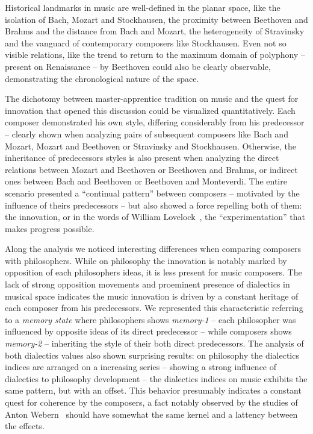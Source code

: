 \documentclass[
 aip,
 jmp,
 amsmath,amssymb,
 reprint,
]{revtex4-1}
\begin{document}
Historical landmarks in music are
well-defined in the planar space, like the isolation of Bach, Mozart
and Stockhausen, the
proximity between Beethoven and Brahms and the distance from Bach and Mozart, the heterogeneity of
Stravinsky and the vanguard of contemporary composers
like Stockhausen. Even not so visible relations, like the trend to return to the
maximum domain of polyphony -- present on Renaissance -- by Beethoven
could also be clearly observable, demonstrating the chronological nature of the
space. 

The dichotomy between
master-apprentice tradition on music and the quest for innovation that
opened this discussion could be visualized quantitatively. Each
composer demonstrated his own style, differing considerably from his
predecessor -- clearly shown when analyzing pairs of subsequent composers like
Bach and Mozart, Mozart and Beethoven or Stravinsky and
Stockhausen. Otherwise, the inheritance of predecessors styles is also
present when analyzing the direct relations between Mozart and
Beethoven or Beethoven and
Brahms, or indirect ones between Bach and Beethoven
or Beethoven and Monteverdi. The entire scenario presented
a ``continual pattern'' between
composers -- motivated by the influence of theirs predecessors -- but also showed a force
repelling both of them: the innovation, or in the words of William
Lovelock~\cite{Lovelock}, the ``experimentation'' that makes progress possible.

Along the analysis we noticed interesting differences when comparing
composers with philosophers. While on philosophy the
innovation is notably marked by opposition of each philosophers ideas,
it is less present for music composers. The lack of strong %
opposition movements and proeminent presence of dialectics in musical space indicates the music innovation is driven by
a constant heritage of each composer from his predecessors. We
represented this characteristic referring to a \textit{memory state}
where philosophers shows \textit{memory-1} -- each philosopher was
influenced by opposite ideas of its direct predecessor -- while
composers shows \textit{memory-2} -- inheriting the style of their
both direct predecessors.
The
analysis of both dialectics values also shown surprising
results: on philosophy the dialectics indices are arranged on a
increasing series -- showing a strong influence of
dialectics to philosophy development -- the dialectics indices on
music exhibits the same pattern, but with an offset. This behavior presumably indicates a
constant quest for coherence by the composers, a fact notably observed by
the studies of Anton Webern~\cite{Webern} should have somewhat the same
kernel and a lattency between the effects.
\end{document}
